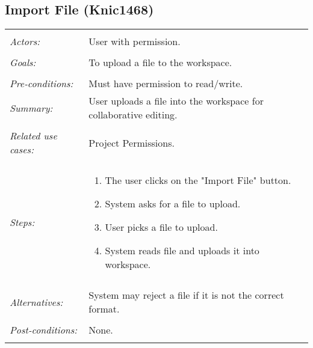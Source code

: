 \subsection{Import File (Knic1468)}
\begin{tabular}{ p{2cm} p{12cm} }
\hline
\\
\textit{Actors:} & User with permission.\\
\\
\textit{Goals:} & To upload a file to the workspace. \\
\\
\textit{Pre-conditions:} & Must have permission to read/write. 
\\
\textit{Summary:} & User uploads a file into the workspace for collaborative editing. \\
\\
\textit{Related use cases:} & Project Permissions. \\
\\
\textit{Steps:} & \begin{enumerate}
 \item The user clicks on the "Import File" button. 
 \item System asks for a file to upload. 
 \item User picks a file to upload. 
 \item System reads file and uploads it into workspace. 
 \end{enumerate}\\
 \\
 \textit{Alternatives:} & System may reject a file if it is not the correct format.\\
 \\
 \textit{Post-conditions:} & None. \\
 \\
\hline
\end{tabular}

